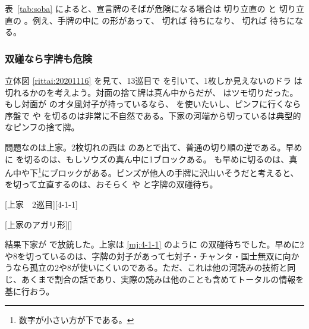 \documentclass[10pt, twocolumn]{article}
\begin{document}
表~\ref{tab:soba} によると、宣言牌のそばが危険になる場合は  切り立直の  と  切り立直の 。例え、手牌の中に  の形があって、 切れば  待ちになり、 切れば  待ちになる。

\subsubsection*{双碰なら字牌も危険}

\begin{rittai}[h]
  \centering
  
  
  \caption{Mリーグ2020 11/16 第2回戦 南2局 2本場（ツモ切り暗転なし）\citep[][p.~45]{muhai}}
  \label{rittai:20201116}
\end{rittai}

立体図 \ref{rittai:20201116} を見て、13巡目で  を引いて、1枚しか見えないのドラ  は切れるかのを考えよう。対面の捨て牌は真ん中からだが、 はツモ切りだった。もし対面が  のオタ風対子が持っているなら、 を使いたいし、ピンフに行くなら序盤で  や  を切るのは非常に不自然である。下家の河端から切っているは典型的なピンフの捨て牌。

問題なのは上家。2枚切れの西は  のあとで出て、普通の切り順の逆である。早めに  を切るのは、もしソウズの真ん中に1ブロックある。 も早めに切るのは、真ん中や下\footnote{数字が小さい方が下である。}にブロックがある。ピンズが他人の手牌に沢山いそうだと考えると、 を切って立直するのは、おそらく  や  と字牌の双碰待ち。

[上家　2巡目][4-1-1]

[上家のアガリ形][]

結果下家が  で放銃した。上家は \ref{mj:4-1-1} のように  の双碰待ちでした。早めに2や8を切っているのは、字牌の対子があって七対子・チャンタ・国士無双に向かうなら孤立の2や8が使いにくいのである。ただ、これは他の河読みの技術と同じ、あくまで割合の話であり、実際の読みは他のことも含めてトータルの情報を基に行おう。
\end{document}
